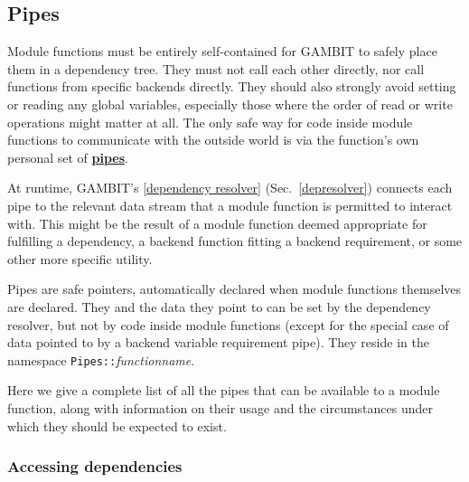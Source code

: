 \documentclass[pdftex,twocolumn,epjc3_preprint,runningheads]{svjour3}
\renewcommand{\_}{\discretionary{\underscore}{}{\underscore}}
\newcommand\cpp[1]{{\lstinline!#1!}}  %
\newcommand{\cross}[1]{\ref{#1}}
\newcommand{\doublecross}[2]{\hyperref[#2]{\textbf{#1}}}
\newcommand{\metavarf}[1]{\textit{\color{darkgreen}\footnotesize\textrm{#1}}}
\newcommand{\metavar}{\metavarf}
\newcommand{\gambit}{\textsf{GAMBIT}\xspace}
\newcommand{\GB}{\gambit}
\begin{document}
\subsection{Pipes}

Module functions must be entirely self-contained for \GB to safely place them in a dependency tree. They must not call each other directly, nor call functions from specific backends directly.  They should also strongly avoid setting or reading any global variables, especially those where the order of read or write operations might matter at all.  The only safe way for code inside module functions to communicate with the outside world is via the function's own personal set of \doublecross{pipes}{pipe}.

At runtime, \GB's \cross{dependency resolver} (Sec.\ \ref{depresolver}) connects each pipe to the relevant data stream that a module function is permitted to interact with.  This might be the result of a module function deemed appropriate for fulfilling a dependency, a backend function fitting a backend requirement, or some other more specific utility.

Pipes are safe pointers, automatically declared when module functions themselves are declared.  They and the data they point to can be set by the dependency resolver, but not by code inside module functions (except for the special case of data pointed to by a backend variable requirement pipe).  They reside in the namespace \cpp{Pipes::}\metavar{function\_name}.

Here we give a complete list of all the pipes that can be available to a module function, along with information on their usage and the circumstances under which they should be expected to exist.

\subsubsection{Accessing dependencies}
\label{accessing_dep}
\end{document}
